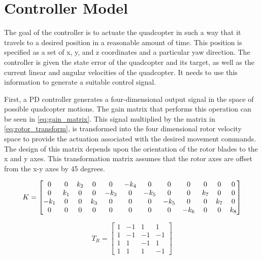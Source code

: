 \documentclass[letterpaper,12pt,titlepage,oneside,final]{book}
\begin{document}
\section{Controller Model}


The goal of the controller is to actuate the quadcopter in such a way that it travels to a desired position in a reasonable amount of time. 
This position is specified as a set of x, y, and z coordinates and a particular yaw direction. 
The controller is given the state error of the quadcopter and its target, as well as the current linear and angular velocities of the quadcopter. 
It needs to use this information to generate a suitable control signal.

First, a PD controller generates a four-dimensional output signal in the space of possible quadcopter motions. 
The gain matrix that performs this operation can be seen in \eqref{eq:gain_matrix}. 
This signal multiplied by the matrix in \eqref{eq:rotor_transform}, is transformed into the four dimensional rotor velocity space to provide the actuation associated with the desired movement commands.
The design of this matrix depends upon the orientation of the rotor blades to the x and y axes. 
This transformation matrix assumes that the rotor axes are offset from the x-y axes by 45 degrees.

\begin{equation} \label{eq:gain_matrix}
K =
\setcounter{MaxMatrixCols}{12}
\begin{bmatrix}
0 & 0 & k_{2} & 0 & 0 & -k_{4} & 0 & 0 & 0 & 0 & 0 & 0 \\
0 & k_{1} & 0 & 0 & -k_{3} & 0 & -k_{5} & 0 & 0 & k_{7} & 0 & 0 \\
-k_{1} & 0 & 0 & k_{3} & 0 & 0 & 0 & -k_{5} & 0 & 0 & k_{7} & 0 \\
0 & 0 & 0 & 0 & 0 & 0 & 0 & 0 & -k_{6} & 0 & 0 & k_{8}
\end{bmatrix}
\end{equation}

\begin{equation} \label{eq:rotor_transform}
T_{R} = 
\begin{bmatrix}
1 & -1 & 1 & 1 \\
1 & -1 & -1 & -1 \\
1 & 1 & -1 & 1 \\
1 & 1 & 1 & -1
\end{bmatrix}
\end{equation}
\end{document}

